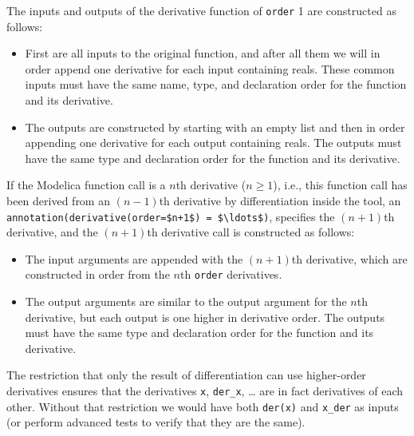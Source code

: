The inputs and outputs of the derivative function of {\lstinline!order!} 1 are constructed as
follows:
\begin{itemize}
\item
  First are all inputs to the original function, and after all them we
  will in order append one derivative for each input containing reals.
  These common inputs must have the same name, type, and declaration
  order for the function and its derivative.
\item
  The outputs are constructed by starting with an empty list and then in
  order appending one derivative for each output containing reals. The
  outputs must have the same type and declaration order for the function
  and its derivative.
\end{itemize}

If the Modelica function call is a $n$th derivative ($n \geq 1$), i.e., this function call has been derived from an $(n-1)$th derivative by differentiation inside the tool, an {\lstinline!annotation(derivative(order=$n+1$) = $\ldots$)!}, specifies the $(n+1)$th derivative, and the $(n+1)$th derivative call is constructed as follows:
\begin{itemize}
\item
  The input arguments are appended with the $(n+1)$th derivative, which are constructed in order from the $n$th {\lstinline!order!} derivatives.
\item
  The output arguments are similar to the output argument for the $n$th derivative, but each output is one higher in derivative order.
  The outputs must have the same type and declaration order for the function and its derivative.
\end{itemize}

\begin{nonnormative}
The restriction that only the result of differentiation can use
higher-order derivatives ensures that the derivatives {\lstinline!x!}, {\lstinline!der_x!},
\ldots{} are in fact derivatives of each other. Without that restriction
we would have both {\lstinline!der(x)!} and {\lstinline!x_der!} as inputs (or perform advanced
tests to verify that they are the same).
\end{nonnormative}

